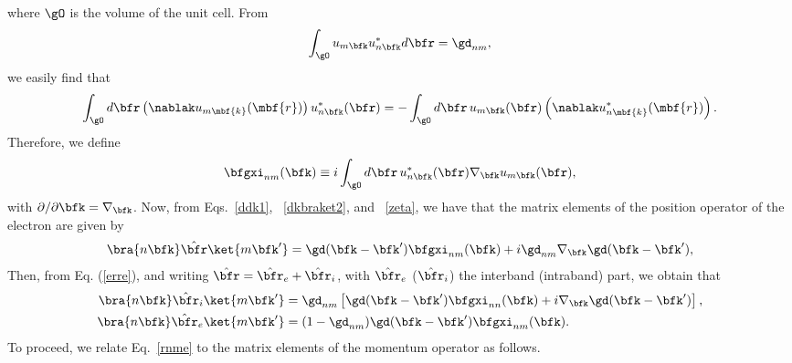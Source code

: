 where $\gO$ is the volume of the unit cell.
From
\begin{align}\label{dnm1}
\int_\gO u_{m\bfk}u^*_{n\bfk}d\bfr=\gd_{nm},
\end{align}
we easily find that
\begin{align}\label{dnm2}
\int_\gO d\bfr
\left(\nablak u_{m\mbf{k}}(\mbf{r})\right)
u^*_{n\bfk}(\bfr)=
-\int_\gO 
d\bfr\,
u_{m\bfk}(\bfr)
\left(\nablak u^*_{n\mbf{k}}(\mbf{r})\right)
.
\end{align}
Therefore, we define
\begin{align}\label{zeta}
\bfgxi_{nm}(\bfk) \equiv i\int_{\gO} d\bfr\, u^*_{n\bfk}(\bfr)\nabla_{\bfk}u_{m\bfk}(\bfr),
\end{align} 
with $\partial/\partial\bfk=\nabla_{\bfk}$.
Now, from Eqs.~\eqref{ddk1}, ~\eqref{dkbraket2},
and ~\eqref{zeta},
 we have that the matrix elements of
the position operator of the electron are given by
\begin{align}\label{erre}
\bra{n\bfk}\hat\bfr\ket{m\bfk'} = \gd(\bfk-\bfk')\bfgxi_{nm}(\bfk)
+i\gd_{nm}\nabla_\bfk\gd(\bfk-\bfk'),
\end{align}
Then, from Eq. (\ref{erre}), and writing $\hat\bfr=\hat\bfr_e+\hat\bfr_i$, with
$\hat\bfr_e$ ($\hat\bfr_i$) the interband (intraband) part, we obtain that
\begin{align}\label{rnmi}
\bra{n\bfk}\hat\bfr_i\ket{m\bfk'} &= \gd_{nm}\left[\gd(\bfk-\bfk')\bfgxi_{nn}(\bfk)
+i\nabla_\bfk\gd(\bfk-\bfk')\right], \\
\bra{n\bfk}\hat\bfr_e\ket{m\bfk'} &= (1-\gd_{nm})\gd(\bfk-\bfk')\bfgxi_{nm}(\bfk).
\label{rnme}
\end{align} 
To proceed, we relate Eq.~\eqref{rnme} to the matrix elements of the
momentum operator as follows. 

